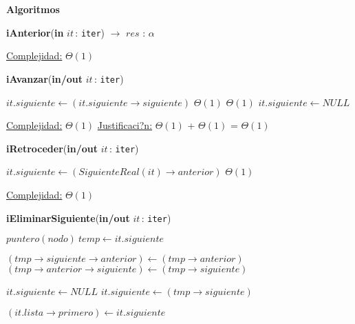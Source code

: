 \documentclass[a4paper,10pt]{article}
\let\TipoVariable=\texttt
\let\ModificadorArgumento=\textbf
\newcommand{\In}[2]{\ModificadorArgumento{in} \ensuremath{#1}\,: \TipoVariable{#2}\xspace}
\newcommand{\Inout}[2]{\ModificadorArgumento{in/out} \ensuremath{#1}\,: \TipoVariable{#2}\xspace}
\newenvironment{Algoritmos}{%
  \vspace*{2ex}%
  \noindent\textbf{\Large Algoritmos}%
  \vspace*{2ex}%
}{}
\begin{document}
\begin{Algoritmos}
\begin{algorithm}[H]{\textbf{iAnterior}(\In{it}{iter}) $\to$ $res$ : $\alpha$}
\begin{algorithmic}[1]
			\medskip
			\Statex \underline{Complejidad:} $\Theta(1)$
    	\end{algorithmic}
\end{algorithm}



\begin{algorithm}[H]
	\begin{algorithmic}[1]
		\State \textbf{iAvanzar}(\Inout{it}{iter})
		
			\State $it.siguiente \gets (it.siguiente\rightarrow siguiente)$	\Comment $\Theta(1)$
				\Comment $\Theta(1)$
				\State $it.siguiente \gets NULL$	
			\EndIf

			\medskip
			\Statex \underline{Complejidad:} $\Theta(1)$
			\Statex \underline{Justificaci?n:}  $\Theta(1)$ + $\Theta(1)$ = $\Theta(1)$
    	\end{algorithmic}
\end{algorithm}
	
	
\begin{algorithm}[H]
	\begin{algorithmic}[1]
		\State \textbf{iRetroceder}(\Inout{it}{iter})
		
			\State $it.siguiente \gets (SiguienteReal(it)\rightarrow anterior)$	\Comment $\Theta(1)$

			\medskip
			\Statex \underline{Complejidad:} $\Theta(1)$
    	\end{algorithmic}
\end{algorithm}
	
	
\begin{algorithm}[H]
	\begin{algorithmic}[1]
		\State \textbf{iEliminarSiguiente}(\Inout{it}{iter})
		
			\State $puntero(nodo) \ temp \gets it.siguiente$
			
			\State $(tmp\rightarrow siguiente\rightarrow anterior) \gets (tmp\rightarrow anterior)$
			\State $(tmp\rightarrow anterior\rightarrow siguiente) \gets (tmp\rightarrow siguiente)$
		
				\State $it.siguiente \gets NULL$
			\Else
				\State $it.siguiente \gets (tmp\rightarrow siguiente)$	
			\EndIf
			
				\State $(it.lista\rightarrow primero) \gets it.siguiente$
			\EndIf
			

\end{algorithmic}
\end{algorithm}
\end{Algoritmos}
\end{document}
